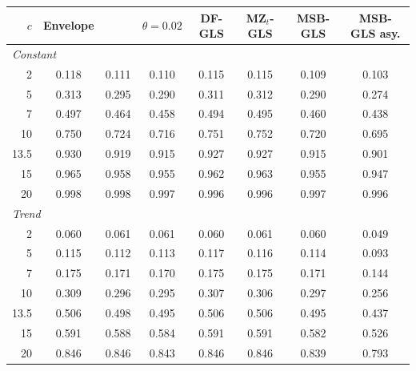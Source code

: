\begin{tabular}{rccccccc}
\toprule
$c$ & Envelope & \RMGLS{} & $\theta = 0.02$ & DF-GLS & MZ$_t$-GLS & MSB-GLS & MSB-GLS asy.\\
\midrule
\multicolumn{8}{l}{\emph{Constant}}\\
2 & 0.118 & 0.111 & 0.110 & 0.115 & 0.115 & 0.109 & 0.103 \\
5 & 0.313 & 0.295 & 0.290 & 0.311 & 0.312 & 0.290 & 0.274 \\
7 & 0.497 & 0.464 & 0.458 & 0.494 & 0.495 & 0.460 & 0.438 \\
10 & 0.750 & 0.724 & 0.716 & 0.751 & 0.752 & 0.720 & 0.695 \\
13.5 & 0.930 & 0.919 & 0.915 & 0.927 & 0.927 & 0.915 & 0.901 \\
15 & 0.965 & 0.958 & 0.955 & 0.962 & 0.963 & 0.955 & 0.947 \\
20 & 0.998 & 0.998 & 0.997 & 0.996 & 0.996 & 0.997 & 0.996 \\
\multicolumn{8}{l}{\emph{Trend}}\\
2 & 0.060 & 0.061 & 0.061 & 0.060 & 0.061 & 0.060 & 0.049 \\
5 & 0.115 & 0.112 & 0.113 & 0.117 & 0.116 & 0.114 & 0.093 \\
7 & 0.175 & 0.171 & 0.170 & 0.175 & 0.175 & 0.171 & 0.144 \\
10 & 0.309 & 0.296 & 0.295 & 0.307 & 0.306 & 0.297 & 0.256 \\
13.5 & 0.506 & 0.498 & 0.495 & 0.506 & 0.506 & 0.495 & 0.437 \\
15 & 0.591 & 0.588 & 0.584 & 0.591 & 0.591 & 0.582 & 0.526 \\
20 & 0.846 & 0.846 & 0.843 & 0.846 & 0.846 & 0.839 & 0.793 \\
\bottomrule
\end{tabular}

